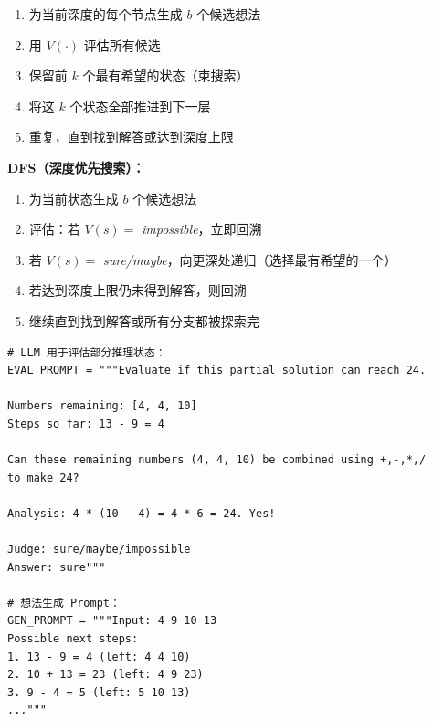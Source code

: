 \begin{enumerate}
  \item 为当前深度的每个节点生成 $b$ 个候选想法
  \item 用 $V(\cdot)$ 评估所有候选
  \item 保留前 $k$ 个最有希望的状态（束搜索）
  \item 将这 $k$ 个状态全部推进到下一层
  \item 重复，直到找到解答或达到深度上限
\end{enumerate}

\textbf{DFS（深度优先搜索）：}

\begin{enumerate}
  \item 为当前状态生成 $b$ 个候选想法
  \item 评估：若 $V(s) =$ \emph{impossible}，立即回溯
  \item 若 $V(s) =$ \emph{sure/maybe}，向更深处递归（选择最有希望的一个）
  \item 若达到深度上限仍未得到解答，则回溯
  \item 继续直到找到解答或所有分支都被探索完
\end{enumerate}

\begin{examplebox}
\begin{lstlisting}[style=pythonstyle]
# LLM 用于评估部分推理状态：
EVAL_PROMPT = """Evaluate if this partial solution can reach 24.

Numbers remaining: [4, 4, 10]
Steps so far: 13 - 9 = 4

Can these remaining numbers (4, 4, 10) be combined using +,-,*,/
to make 24?

Analysis: 4 * (10 - 4) = 4 * 6 = 24. Yes!

Judge: sure/maybe/impossible
Answer: sure"""

# 想法生成 Prompt：
GEN_PROMPT = """Input: 4 9 10 13
Possible next steps:
1. 13 - 9 = 4 (left: 4 4 10)
2. 10 + 13 = 23 (left: 4 9 23)
3. 9 - 4 = 5 (left: 5 10 13)
..."""
\end{lstlisting}
\end{examplebox}

